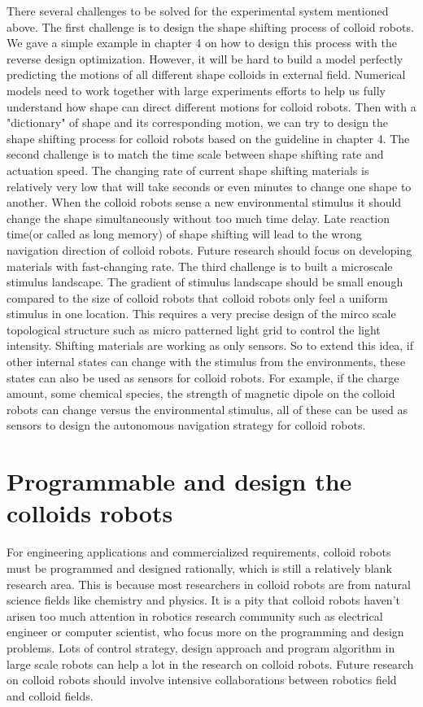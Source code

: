 There several challenges to be solved for the experimental system mentioned above. The first challenge  is to design the shape shifting process of colloid robots. We gave a simple example in chapter 4 on how to design this process with the reverse design optimization. However, it will be hard to build a model perfectly predicting the motions of all different shape colloids in external field. Numerical models need to work together with large experiments efforts to help us fully understand how shape can direct different motions for colloid robots. \cite{lee2019directed} Then with a "dictionary" of shape and its corresponding motion, we can try to design the shape shifting process for colloid robots based on the guideline in chapter 4. The second challenge is to match the time scale between shape shifting rate and actuation speed. The changing rate of current shape shifting materials is relatively very low that will take seconds or even minutes to change one shape to another. When the colloid robots sense a new environmental stimulus it should change the shape simultaneously without too  much time delay. Late reaction time(or called as long memory) of shape shifting will  lead to the wrong navigation direction of colloid robots. Future research should focus on developing materials with fast-changing rate. The third challenge is to built a microscale stimulus landscape. The gradient of stimulus landscape should be small enough compared to the size of colloid robots that colloid robots only feel a uniform stimulus in one location. This requires a very precise  design of the mirco scale topological structure such as micro patterned light grid to control the light intensity. Shifting materials are working as only sensors. So to extend this idea, if other internal states can change with the stimulus from the environments, these states can also be used as sensors for colloid robots. For example, if the charge amount, some chemical species, the strength of magnetic dipole on the colloid robots can change versus the environmental stimulus, all of these can be used as sensors to design the autonomous navigation strategy for colloid robots.  




\section{Programmable and design the colloids robots}
For engineering applications and commercialized requirements, colloid robots must be programmed and designed rationally, which is still a relatively blank research area. This is because most researchers in colloid robots are from natural science fields like chemistry and physics. It is a pity that colloid robots haven't arisen too much attention in robotics research community such as electrical engineer or computer scientist, who focus more on the programming and design problems.\cite{das2019cellular}  Lots of control strategy, design approach and program algorithm in large scale robots can help a lot in the research on colloid robots.  Future research on colloid robots should involve intensive collaborations between robotics field and colloid fields.

